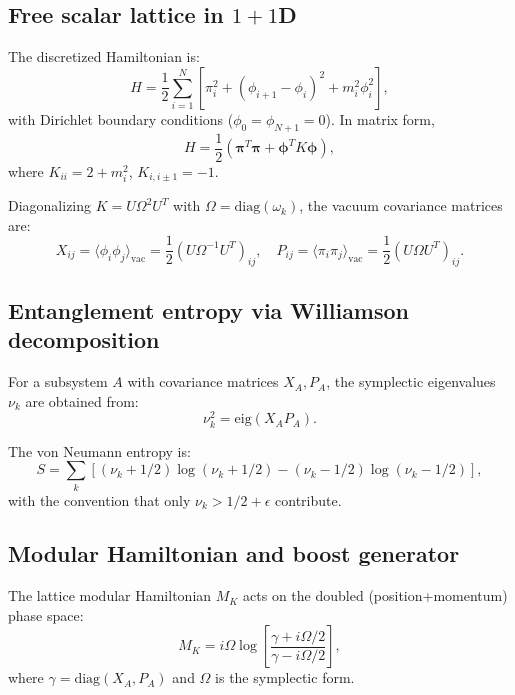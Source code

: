 \documentclass[11pt]{article}
\begin{document}
\subsection{Free scalar lattice in $1{+}1$D}

The discretized Hamiltonian is:
\begin{equation}
H = \frac{1}{2}\sum_{i=1}^{N}\left[\pi_i^2 + (\phi_{i+1} - \phi_i)^2 + m_i^2 \phi_i^2\right],
\end{equation}
with Dirichlet boundary conditions ($\phi_0 = \phi_{N+1} = 0$). In matrix form,
\begin{equation}
H = \frac{1}{2}(\boldsymbol{\pi}^T \boldsymbol{\pi} + \boldsymbol{\phi}^T K \boldsymbol{\phi}),
\end{equation}
where $K_{ii} = 2 + m_i^2$, $K_{i,i\pm 1} = -1$.

Diagonalizing $K = U \Omega^2 U^T$ with $\Omega = \mathrm{diag}(\omega_k)$, the vacuum covariance matrices are:
\begin{equation}
X_{ij} = \langle\phi_i \phi_j\rangle_{\mathrm{vac}} = \frac{1}{2}(U \Omega^{-1} U^T)_{ij}, \quad
P_{ij} = \langle\pi_i \pi_j\rangle_{\mathrm{vac}} = \frac{1}{2}(U \Omega U^T)_{ij}.
\end{equation}

\subsection{Entanglement entropy via Williamson decomposition}

For a subsystem $A$ with covariance matrices $X_A, P_A$, the symplectic eigenvalues $\nu_k$ are obtained from:
\begin{equation}
\nu_k^2 = \mathrm{eig}(X_A P_A).
\end{equation}

The von Neumann entropy is:
\begin{equation}
S = \sum_k \left[(\nu_k + 1/2)\log(\nu_k + 1/2) - (\nu_k - 1/2)\log(\nu_k - 1/2)\right],
\end{equation}
with the convention that only $\nu_k > 1/2 + \epsilon$ contribute.

\subsection{Modular Hamiltonian and boost generator}

The lattice modular Hamiltonian $M_K$ acts on the doubled (position+momentum) phase space:
\begin{equation}
M_K = i \Omega \log\left[\frac{\gamma + i\Omega/2}{\gamma - i\Omega/2}\right],
\end{equation}
where $\gamma = \mathrm{diag}(X_A, P_A)$ and $\Omega$ is the symplectic form.
\end{document}
